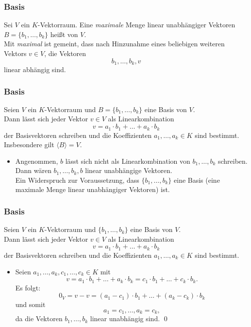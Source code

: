 %
%
\begin{frame}\frametitle{Basis}
	
	Sei $V$ ein $K$-Vektorraum.
	Eine \textit{maximale} Menge linear unabhängiger Vektoren $B=\{b_1,\ldots, b_k\}$ hei{\ss}t
	 von $V$.\\
	
	\vspace{10mm}
	\pause
	Mit \textit{maximal} ist gemeint, dass nach Hinzunahme eines beliebigen weiteren Vektors $v\in V$, die Vektoren
	$$
		b_1,\ldots, b_k, v
	$$
	linear abhängig sind.
	
\end{frame}
%
%
\begin{frame}\frametitle{Basis}
	
	Seien $V$ ein $K$-Vektorraum und $B=\{b_1,\ldots, b_k\}$ eine Basis von $V$.\\[1mm]
	Dann lässt sich jeder Vektor $v\in V$ als Linearkombination 
	$$
		v = a_1\cdot b_1 + \ldots + a_k\cdot b_k
	$$
	der Basisvektoren schreiben und die Koeffizienten $a_1,\ldots, a_k\in K$ sind  bestimmt.
	Insbesondere gilt $\langle B \rangle = V$.

	\pause
	\vspace{3mm}
	
	\begin{itemize}
		\item
			Angenommen, $b$ lässt sich nicht als Linearkombination von $b_1,\ldots, b_k$ schreiben. \\[1mm]
			\pause
			Dann wären $b_1,\ldots, b_k, b$ linear unabhängige Vektoren.\\[1mm] 
			\pause
			Ein Widerspruch zur Voraussetzung, dass $\{b_1,\ldots, b_k\}$ eine Basis 
			(eine maximale Menge linear unabhängiger Vektoren) ist.
	\end{itemize}
	
\end{frame}
%
%
\begin{frame}\frametitle{Basis}
	
	Seien $V$ ein $K$-Vektorraum und $\{b_1,\ldots, b_k\}$ eine Basis von $V$.\\[1mm]
	Dann lässt sich jeder Vektor $v\in V$ als Linearkombination 
	$$
		v = a_1\cdot b_1 + \ldots + a_k\cdot b_k
	$$
	der Basisvektoren schreiben und die Koeffizienten $a_1,\ldots, a_k\in K$ sind  bestimmt.

	\vspace{3mm}
	
	\begin{itemize}
		\item {} 
			Seien $a_1,\ldots, a_k, c_1,\ldots, c_k \in K$ mit
			$$
				v = a_1\cdot b_1 + \ldots + a_k\cdot b_k = c_1\cdot b_1 + \ldots + c_k\cdot b_k.
			$$
			\pause
			Es folgt:
			$$
				0_V =v-v= (a_1-c_1)\cdot b_1 + \ldots + (a_k-c_k)\cdot b_k
			$$
			und somit 
			$$
				a_1=c_1, \ldots, a_k=c_k,
			$$
			da die Vektoren $b_1,\ldots, b_k$ linear unabhängig sind.
			\qed
	\end{itemize}
	
\end{frame}
%
